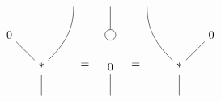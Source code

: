 \[
  \begin{tikzpicture}[baseline]
    \path
    (-1,1) node(0) {0}
    (1,2) node(x) {}
    (0,0) node(*) {*}
    (0,-1) node(res) {}
    ;

    \draw (0) -- (*);
    \draw (x) to[out=270,in=45] (*);
    \draw (*) -- (res);
  \end{tikzpicture}
  =\quad
  \begin{tikzpicture}[baseline]
    \path
    (0,0) node(0) {0}
    (0,2) node(x) {}
    (0,-1) node(res) {}
    (0,1) node[circle,draw](del) {}
    ;

    \draw (0) -- (res);
    \draw (x) -- (del);
  \end{tikzpicture}
  \quad=
  \begin{tikzpicture}[baseline]
    \path
    (1,1) node(0) {0}
    (-1,2) node(x) {}
    (0,0) node(*) {*}
    (0,-1) node(res) {}
    ;

    \draw (0) -- (*);
    \draw (x) to[out=270,in=135] (*);
    \draw (*) -- (res);
  \end{tikzpicture}
\]
